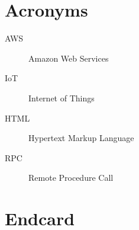 \documentclass[../main.tex]{subfiles}
\begin{document}
\chapter{Acronyms}

\begin{description}
  \item[AWS] Amazon Web Services
  \item[IoT] Internet of Things
  \item[HTML] Hypertext Markup Language
  \item[RPC] Remote Procedure Call
\end{description}

\chapter{Endcard}
\end{document}
